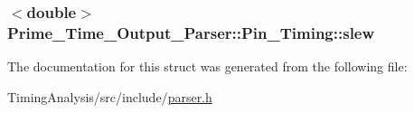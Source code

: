 \hypertarget{structPrime__Time__Output__Parser_1_1Pin__Timing_af7d7bae7417f6586e445c5bb415a1d43}{
\subsubsection[{slew}]{$<$double$>$ Prime\-\_\-\-Time\-\_\-\-Output\-\_\-\-Parser\-::\-Pin\-\_\-\-Timing\-::slew}}\label{structPrime__Time__Output__Parser_1_1Pin__Timing_af7d7bae7417f6586e445c5bb415a1d43}


The documentation for this struct was generated from the following file\-:\begin{DoxyCompactItemize}
\item 
Timing\-Analysis/src/include/\hyperlink{parser_8h}{parser.\-h}\end{DoxyCompactItemize}
